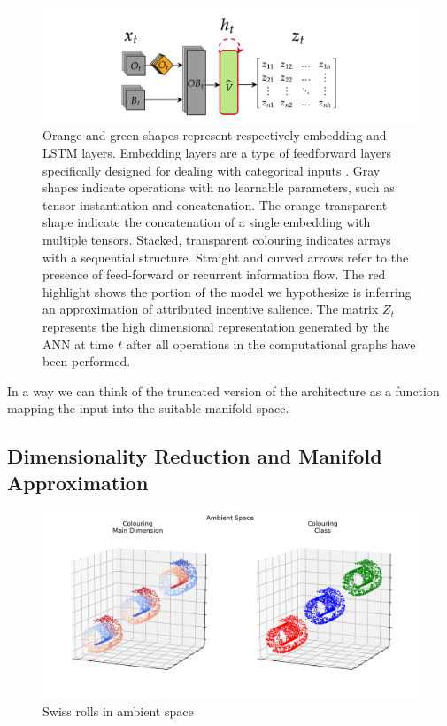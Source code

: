 \begin{figure}[h]
  \centering
  \includegraphics[width=\textwidth]{images/chapter_4/representation_extractor.png}
    \caption[\textbf{The procedure for generating latent representations generated by an ANN}]{Orange and green shapes represent respectively embedding and LSTM layers. Embedding layers are a type of feedforward layers specifically designed for dealing with categorical inputs \cite{chollet2015keras}. Gray shapes indicate operations with no learnable parameters, such as tensor instantiation and concatenation. The orange transparent shape indicate the concatenation of a single embedding with multiple tensors. Stacked, transparent colouring indicates arrays with a sequential structure. Straight and curved arrows refer to the presence of feed-forward or recurrent information flow. The red highlight shows the portion of the model we hypothesize is inferring an approximation of attributed incentive salience. The matrix $Z_t$ represents the high dimensional representation generated by the ANN at time $t$ after all operations in the computational graphs have been performed.}
    \label{fig: repr_extr}
\end{figure}
In a way we can think of the truncated version of the architecture as a function mapping the input into the suitable manifold space.


\subsection{Dimensionality Reduction and Manifold Approximation}
\label{dim_reduction}
\begin{figure}[h]
  \centering
  \includegraphics[width=\textwidth]{images/chapter_4/ambient.png}
    \caption[\textbf{Swiss rolls in ambient space}]{Swiss rolls in ambient space}
    \label{fig: swiss_ambient}
\end{figure}

